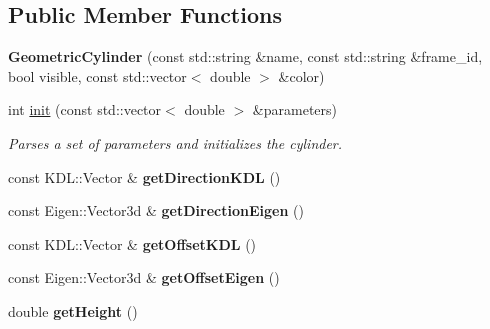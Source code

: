 \subsection*{Public Member Functions}
\begin{DoxyCompactItemize}
\item 
\hypertarget{classhiqp_1_1geometric__primitives_1_1GeometricCylinder_af597b83669074eaf0eeb984fb6a90da6}{{\bfseries Geometric\-Cylinder} (const std\-::string \&name, const std\-::string \&frame\-\_\-id, bool visible, const std\-::vector$<$ double $>$ \&color)}\label{classhiqp_1_1geometric__primitives_1_1GeometricCylinder_af597b83669074eaf0eeb984fb6a90da6}

\item 
int \hyperlink{classhiqp_1_1geometric__primitives_1_1GeometricCylinder_aa3a355a12068bfd1b51e3ea07b08e469}{init} (const std\-::vector$<$ double $>$ \&parameters)
\begin{DoxyCompactList}\small\item\em Parses a set of parameters and initializes the cylinder. \end{DoxyCompactList}\item 
\hypertarget{classhiqp_1_1geometric__primitives_1_1GeometricCylinder_a91a05ff0aea792fcb0d94f3a9c17c8ed}{const K\-D\-L\-::\-Vector \& {\bfseries get\-Direction\-K\-D\-L} ()}\label{classhiqp_1_1geometric__primitives_1_1GeometricCylinder_a91a05ff0aea792fcb0d94f3a9c17c8ed}

\item 
\hypertarget{classhiqp_1_1geometric__primitives_1_1GeometricCylinder_a91c16962324b4ffefd6b1ff3eaf2c29b}{const Eigen\-::\-Vector3d \& {\bfseries get\-Direction\-Eigen} ()}\label{classhiqp_1_1geometric__primitives_1_1GeometricCylinder_a91c16962324b4ffefd6b1ff3eaf2c29b}

\item 
\hypertarget{classhiqp_1_1geometric__primitives_1_1GeometricCylinder_a8cce11af002bf3efb3239050e3928bb9}{const K\-D\-L\-::\-Vector \& {\bfseries get\-Offset\-K\-D\-L} ()}\label{classhiqp_1_1geometric__primitives_1_1GeometricCylinder_a8cce11af002bf3efb3239050e3928bb9}

\item 
\hypertarget{classhiqp_1_1geometric__primitives_1_1GeometricCylinder_a9a298067229c935701638410b24ff0f2}{const Eigen\-::\-Vector3d \& {\bfseries get\-Offset\-Eigen} ()}\label{classhiqp_1_1geometric__primitives_1_1GeometricCylinder_a9a298067229c935701638410b24ff0f2}

\item 
\hypertarget{classhiqp_1_1geometric__primitives_1_1GeometricCylinder_a78645047ee5004b0f1f30a5eb5be7654}{double {\bfseries get\-Height} ()}\label{classhiqp_1_1geometric__primitives_1_1GeometricCylinder_a78645047ee5004b0f1f30a5eb5be7654}


\end{DoxyCompactItemize}
